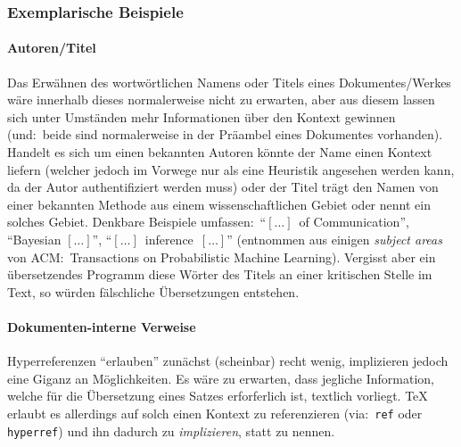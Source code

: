 \subsubsection{Exemplarische Beispiele}
\paragraph*{Autoren/Titel}%
%
%
%
Das Erwähnen des wortwörtlichen Namens oder Titels eines Dokumentes/Werkes wäre innerhalb dieses normalerweise nicht zu erwarten, aber aus diesem lassen sich unter Umständen mehr Informationen über den Kontext gewinnen (und:\ beide sind normalerweise in der Präambel eines Dokumentes vorhanden). Handelt es sich um einen bekannten Autoren könnte der Name einen Kontext liefern (welcher jedoch im Vorwege nur als eine Heuristik angesehen werden kann, da der Autor authentifiziert werden muss) oder der Titel trägt den Namen von einer bekannten Methode aus einem wissenschaftlichen Gebiet oder nennt ein solches Gebiet. Denkbare Beispiele umfassen:\ 
\enquote{$[\ldots]$\ of Communication}, \enquote{Bayesian $[\ldots]$}, \enquote{$[\ldots]$\ inference\ $[\ldots]$}
(entnommen aus einigen \textit{subject areas} von ACM:\ Transactions on Probabilistic Machine Learning).
Vergisst aber ein übersetzendes Programm diese Wörter des Titels an einer kritischen Stelle im Text, so würden fälschliche Übersetzungen entstehen.

%
%
%
%
\paragraph*{Dokumenten-interne Verweise}%
Hyperreferenzen \enquote{erlauben} zunächst (scheinbar) recht wenig, implizieren jedoch eine Giganz an Möglichkeiten. Es wäre zu erwarten, dass jegliche Information, welche für die Übersetzung eines Satzes erforferlich ist, textlich vorliegt. \TeX{} erlaubt es allerdings auf solch einen Kontext zu referenzieren (via:\ \texttt{ref} oder \texttt{hyperref}) und ihn dadurch zu \textit{implizieren}, statt zu nennen.


